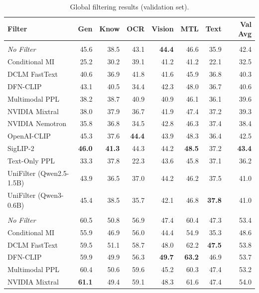 \begin{table}[t]
\centering
\small
\caption{Global filtering results (validation set).}
\label{tab:global-filtering-val}
\begin{tabular}{lrrrrrrr}
\toprule
\textbf{Filter} & \textbf{Gen} & \textbf{Know} & \textbf{OCR} & \textbf{Vision} & \textbf{MTL} & \textbf{Text} & \textbf{Val Avg} \\
\midrule
\rowcolor{gray!8} \multicolumn{8}{l}{\texttt{small} scale} \\
\midrule
\textit{No Filter} & 45.6 & 38.5 & 43.1 & \textbf{44.4} & 46.6 & 35.9 & 42.4 \\
Conditional MI & 25.2 & 30.2 & 39.1 & 41.2 & 41.2 & 22.1 & 32.5 \\
DCLM FastText & 40.6 & 36.9 & 41.8 & 41.6 & 45.9 & 36.8 & 40.3 \\
DFN-CLIP & 43.1 & 40.5 & 34.4 & 42.3 & 48.0 & 36.7 & 40.6 \\
Multimodal PPL & 38.2 & 38.7 & 40.9 & 40.9 & 46.1 & 36.1 & 39.6 \\
NVIDIA Mixtral & 38.0 & 37.9 & 36.7 & 41.9 & 47.4 & 37.2 & 39.3 \\
NVIDIA Nemotron & 35.8 & 36.8 & 34.5 & 42.8 & 46.3 & 37.4 & 38.4 \\
OpenAI-CLIP & 45.3 & 37.6 & \textbf{44.4} & 43.9 & 48.3 & 36.4 & 42.5 \\
SigLIP-2 & \textbf{46.0} & \textbf{41.3} & 44.3 & 44.2 & \textbf{48.5} & 37.2 & \textbf{43.4} \\
Text-Only PPL & 33.3 & 37.8 & 22.3 & 43.6 & 45.8 & 37.1 & 36.2 \\
UniFilter (Qwen2.5-1.5B) & 43.9 & 36.5 & 37.0 & 44.2 & 46.2 & 37.5 & 41.0 \\
UniFilter (Qwen3-0.6B) & 45.4 & 38.5 & 35.7 & 42.1 & 46.8 & \textbf{37.8} & 41.0 \\
\midrule
\rowcolor{gray!8} \multicolumn{8}{l}{\texttt{medium} scale} \\
\midrule
\textit{No Filter} & 60.5 & 50.8 & 56.9 & 47.4 & 60.4 & 47.3 & 53.4 \\
Conditional MI & 55.9 & 46.9 & 56.0 & 44.4 & 54.9 & 35.3 & 48.6 \\
DCLM FastText & 59.5 & 51.1 & 58.7 & 48.0 & 62.2 & \textbf{47.5} & 53.8 \\
DFN-CLIP & 59.9 & 49.9 & 56.3 & \textbf{49.7} & \textbf{63.2} & 46.9 & 53.7 \\
Multimodal PPL & 60.4 & 50.6 & 59.6 & 45.2 & 60.3 & 47.4 & 53.2 \\
NVIDIA Mixtral & \textbf{61.1} & 49.4 & 59.1 & 48.3 & 61.6 & 47.4 & 54.0 \\

\end{tabular}
\end{table}
